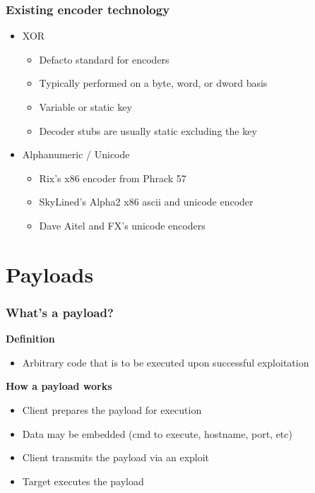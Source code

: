\documentclass{beamer}
\newenvironment{sitemize}{\vspace{1mm}\begin{itemize}\itemsep 4pt\small}{\end{itemize}}
\begin{document}
\begin{frame}[t]
    \frametitle{Existing encoder technology}

    \begin{sitemize}
        \item XOR
        \begin{sitemize}
            \item Defacto standard for encoders
            \item Typically performed on a byte, word, or dword basis
            \item Variable or static key
            \item Decoder stubs are usually static excluding the key
        \end{sitemize}

        \pause
        \item Alphanumeric / Unicode
        \begin{sitemize}
            \item Rix's x86 encoder from Phrack 57
            \item SkyLined's Alpha2 x86 ascii and unicode encoder
	    \item Dave Aitel and FX's unicode encoders
        \end{sitemize}
    \end{sitemize}
\end{frame}

\section{Payloads}

\begin{frame}[t]
    \frametitle{What's a payload?}

    \textbf{Definition}
    \begin{sitemize}
        \item Arbitrary code that is to be executed upon successful
        exploitation
    \end{sitemize}

    \pause
    \textbf{How a payload works}
    \begin{sitemize}
        \item Client prepares the payload for execution
	\pause
	\item Data may be embedded  (cmd to execute, hostname, port, etc)
	\pause
        \item Client transmits the payload via an exploit
	\pause
        \item Target executes the payload
    \end{sitemize}
\end{frame}
\end{document}
